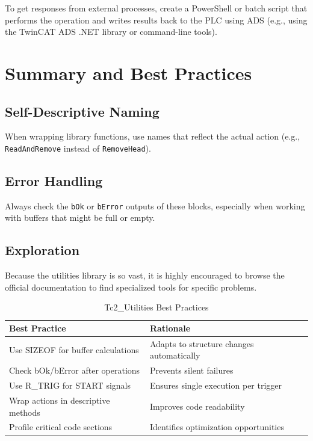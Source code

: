 \documentclass[11pt,a4paper]{article}
\begin{document}
\begin{notebox}
To get responses from external processes, create a PowerShell or batch script that performs the operation and writes results back to the PLC using ADS (e.g., using the TwinCAT ADS .NET library or command-line tools).
\end{notebox}

\section{Summary and Best Practices}

\subsection{Self-Descriptive Naming}

When wrapping library functions, use names that reflect the actual action (e.g., \texttt{ReadAndRemove} instead of \texttt{RemoveHead}).

\subsection{Error Handling}

Always check the \texttt{bOk} or \texttt{bError} outputs of these blocks, especially when working with buffers that might be full or empty.

\subsection{Exploration}

Because the utilities library is so vast, it is highly encouraged to browse the official documentation to find specialized tools for specific problems.

\begin{table}[h]
\centering
\begin{tabular}{@{}ll@{}}
\toprule
\textbf{Best Practice} & \textbf{Rationale} \\
\midrule
Use SIZEOF for buffer calculations & Adapts to structure changes automatically \\
Check bOk/bError after operations & Prevents silent failures \\
Use R\_TRIG for START signals & Ensures single execution per trigger \\
Wrap actions in descriptive methods & Improves code readability \\
Profile critical code sections & Identifies optimization opportunities \\
\bottomrule
\end{tabular}
\caption{Tc2\_Utilities Best Practices}
\end{table}
\end{document}
